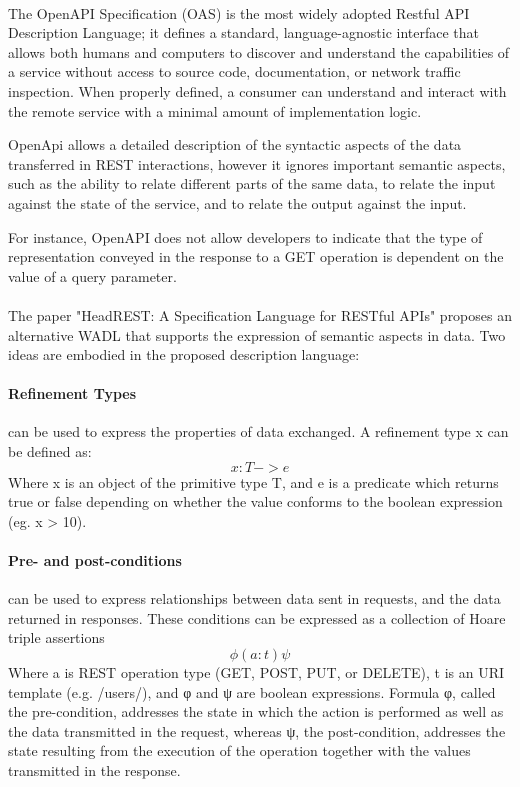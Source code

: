 \paragraph{}

The OpenAPI Specification (OAS) is the most widely adopted Restful API Description Language;
it defines a standard, language-agnostic interface that allows both humans and computers to discover and
understand the capabilities of a service without access to source code, documentation, or network traffic inspection.
When properly defined, a consumer can understand and interact with the remote service with a minimal amount of implementation logic.

OpenApi allows a detailed description of the syntactic aspects of the data transferred in REST interactions, however it ignores important semantic aspects, such as the ability to relate
different parts of the same data, to relate the input against the state of the service, and to relate the output against the input.

For instance, OpenAPI does not allow developers to indicate that the type of representation conveyed in the response to a GET operation is dependent on the value of a query parameter.

\paragraph{}

The paper "HeadREST: A Specification Language for
RESTful APIs" \cite{16} proposes an alternative WADL that supports the expression of semantic aspects in data. Two ideas are embodied in the proposed description language:

\paragraph{Refinement Types} can be used to express the properties of data exchanged.
A refinement type x can be defined as:
\[ x:T -> e \]
Where x is an object of the primitive type T, and e is a predicate which returns true or false depending on whether the value conforms to the boolean expression (eg. x > 10).

\paragraph{Pre- and post-conditions} can be used to express relationships between data sent in
requests, and the data returned in responses. These conditions can be expressed as a collection of Hoare triple assertions
\[ \phi (a : t) \psi \]
Where a is REST operation type (GET, POST, PUT, or DELETE),
t is an URI template (e.g. /users/),
and φ and ψ are boolean expressions.
Formula φ, called the pre-condition, addresses the state in which the action is performed as well as the data transmitted in the request,
whereas ψ, the post-condition, addresses the state resulting from the execution of the operation together with the values transmitted in the response.

